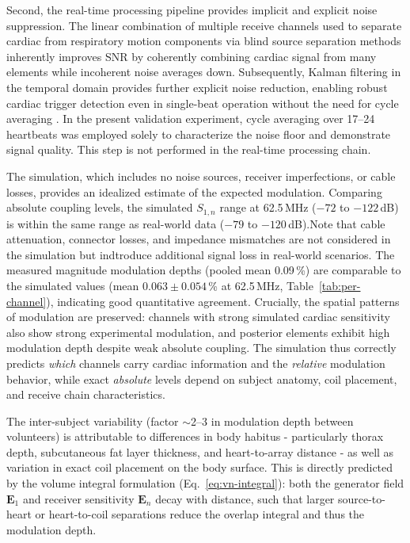 \documentclass[
]{article}
\begin{document}
Second, the real-time processing pipeline provides implicit and explicit noise suppression. The linear combination of multiple receive channels used to separate cardiac from respiratory motion components via blind source separation methods \cite{Bacher2020PerformanceFramework, Bacher2020RetrospectiveCohort} inherently improves SNR by coherently combining cardiac signal from many elements while incoherent noise averages down. Subsequently, Kalman filtering in the temporal domain provides further explicit noise reduction, enabling robust cardiac trigger detection even in single-beat operation without the need for cycle averaging \cite{Bacher2017PilotInitialization, Bacher2018PilotCine, Bacher2017CardiacStudy}. In the present validation experiment, cycle averaging over 17--24 heartbeats was employed solely to characterize the noise floor and demonstrate signal quality. This step is not performed in the real-time processing chain.

The simulation, which includes no noise sources, receiver imperfections, or cable losses, provides an idealized estimate of the expected modulation. Comparing absolute coupling levels, the simulated $S_{1,n}$ range at 62.5\,MHz ($-72$ to $-122$\,dB) is within the same range as real-world data ($-79$ to $-120$\,dB).Note that cable attenuation, connector losses, and impedance mismatches are not considered in the simulation but indtroduce additional signal loss in real-world scenarios. The measured magnitude modulation depths (pooled mean 0.09\,\%) are comparable to the simulated values (mean $0.063 \pm 0.054$\,\% at 62.5\,MHz, Table~\ref{tab:per-channel}), indicating good quantitative agreement. Crucially, the spatial patterns of modulation are preserved: channels with strong simulated cardiac sensitivity also show strong experimental modulation, and posterior elements exhibit high modulation depth despite weak absolute coupling. The simulation thus correctly predicts \emph{which} channels carry cardiac information and the \emph{relative} modulation behavior, while exact \emph{absolute} levels depend on subject anatomy, coil placement, and receive chain characteristics.

The inter-subject variability (factor $\sim$2--3 in modulation depth between volunteers) is attributable to differences in body habitus - particularly thorax depth, subcutaneous fat layer thickness, and heart-to-array distance - as well as variation in exact coil placement on the body surface. This is directly predicted by the volume integral formulation (Eq.~\ref{eq:vn-integral}): both the generator field $\mathbf{E}_1$ and receiver sensitivity $\mathbf{E}_n$ decay with distance, such that larger source-to-heart or heart-to-coil separations reduce the overlap integral and thus the modulation depth.
\end{document}
